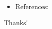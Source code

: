 \begin{frame}
\begin{itemize}
    \item References:
\end{itemize}
    \scriptsize
    
\end{frame}

\begin{frame}
    \begin{center}
        {\Huge\calligra Thanks!} \\
        \vspace{1cm} %
    \end{center}
\end{frame}